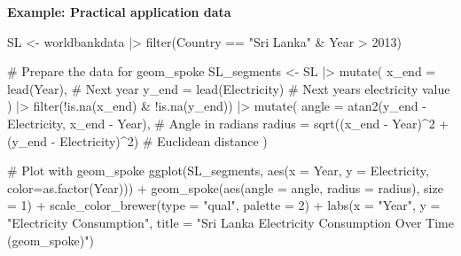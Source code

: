 \documentclass[
  letterpaper,
  DIV=11,
  numbers=noendperiod]{scrreprt}
\newenvironment{Shaded}{\begin{snugshade}}{\end{snugshade}}
\newcommand{\AttributeTok}[1]{\textcolor[rgb]{0.40,0.45,0.13}{#1}}
\newcommand{\CommentTok}[1]{\textcolor[rgb]{0.37,0.37,0.37}{#1}}
\newcommand{\DecValTok}[1]{\textcolor[rgb]{0.68,0.00,0.00}{#1}}
\newcommand{\FunctionTok}[1]{\textcolor[rgb]{0.28,0.35,0.67}{#1}}
\newcommand{\NormalTok}[1]{\textcolor[rgb]{0.00,0.23,0.31}{#1}}
\newcommand{\OtherTok}[1]{\textcolor[rgb]{0.00,0.23,0.31}{#1}}
\newcommand{\SpecialCharTok}[1]{\textcolor[rgb]{0.37,0.37,0.37}{#1}}
\newcommand{\StringTok}[1]{\textcolor[rgb]{0.13,0.47,0.30}{#1}}
\begin{document}
\textbf{Example: Practical application data}

\begin{Shaded}
\begin{Highlighting}[]
\NormalTok{SL }\OtherTok{\textless{}{-}}\NormalTok{ worldbankdata }\SpecialCharTok{|\textgreater{}} 
  \FunctionTok{filter}\NormalTok{(Country }\SpecialCharTok{==} \StringTok{"Sri Lanka"} \SpecialCharTok{\&}\NormalTok{ Year }\SpecialCharTok{\textgreater{}} \DecValTok{2013}\NormalTok{)}

\CommentTok{\# Prepare the data for geom\_spoke}
\NormalTok{SL\_segments }\OtherTok{\textless{}{-}}\NormalTok{ SL }\SpecialCharTok{|\textgreater{}} 
  \FunctionTok{mutate}\NormalTok{(}
    \AttributeTok{x\_end =} \FunctionTok{lead}\NormalTok{(Year),  }\CommentTok{\# Next year}
    \AttributeTok{y\_end =} \FunctionTok{lead}\NormalTok{(Electricity)  }\CommentTok{\# Next year\textquotesingle{}s electricity value}
\NormalTok{  ) }\SpecialCharTok{|\textgreater{}} 
  \FunctionTok{filter}\NormalTok{(}\SpecialCharTok{!}\FunctionTok{is.na}\NormalTok{(x\_end) }\SpecialCharTok{\&} \SpecialCharTok{!}\FunctionTok{is.na}\NormalTok{(y\_end)) }\SpecialCharTok{|\textgreater{}} 
  \FunctionTok{mutate}\NormalTok{(}
    \AttributeTok{angle =} \FunctionTok{atan2}\NormalTok{(y\_end }\SpecialCharTok{{-}}\NormalTok{ Electricity, x\_end }\SpecialCharTok{{-}}\NormalTok{ Year),  }\CommentTok{\# Angle in radians}
    \AttributeTok{radius =} \FunctionTok{sqrt}\NormalTok{((x\_end }\SpecialCharTok{{-}}\NormalTok{ Year)}\SpecialCharTok{\^{}}\DecValTok{2} \SpecialCharTok{+}\NormalTok{ (y\_end }\SpecialCharTok{{-}}\NormalTok{ Electricity)}\SpecialCharTok{\^{}}\DecValTok{2}\NormalTok{)  }\CommentTok{\# Euclidean distance}
\NormalTok{  )}

\CommentTok{\# Plot with geom\_spoke}
\FunctionTok{ggplot}\NormalTok{(SL\_segments, }\FunctionTok{aes}\NormalTok{(}\AttributeTok{x =}\NormalTok{ Year, }\AttributeTok{y =}\NormalTok{ Electricity, }\AttributeTok{color=}\FunctionTok{as.factor}\NormalTok{(Year))) }\SpecialCharTok{+}
  \FunctionTok{geom\_spoke}\NormalTok{(}\FunctionTok{aes}\NormalTok{(}\AttributeTok{angle =}\NormalTok{ angle, }\AttributeTok{radius =}\NormalTok{ radius), }\AttributeTok{size =} \DecValTok{1}\NormalTok{) }\SpecialCharTok{+}
  \FunctionTok{scale\_color\_brewer}\NormalTok{(}\AttributeTok{type =} \StringTok{"qual"}\NormalTok{, }\AttributeTok{palette =} \DecValTok{2}\NormalTok{) }\SpecialCharTok{+}
  \FunctionTok{labs}\NormalTok{(}\AttributeTok{x =} \StringTok{"Year"}\NormalTok{,}
       \AttributeTok{y =} \StringTok{"Electricity Consumption"}\NormalTok{,}
       \AttributeTok{title =} \StringTok{"Sri Lanka Electricity Consumption Over Time (geom\_spoke)"}\NormalTok{)}
\end{Highlighting}
\end{Shaded}
\end{document}
